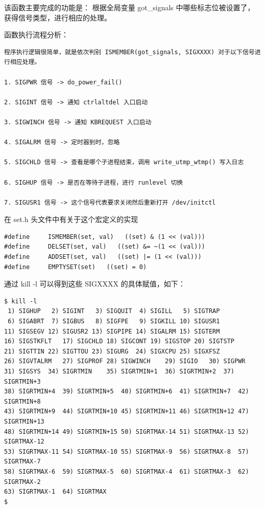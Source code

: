该函数主要完成的功能是： 根据全局变量 got\_signals
中哪些标志位被设置了，获得信号类型，进行相应的处理。

函数执行流程分析：

{\begin{shaded}\begin{verbatim}
程序执行逻辑很简单，就是依次判别 ISMEMBER(got_signals, SIGXXXX) 对于以下信号进行相应处理。

1. SIGPWR 信号 -> do_power_fail()

2. SIGINT 信号 -> 通知 ctrlaltdel 入口启动

3. SIGWINCH 信号 -> 通知 KBREQUEST 入口启动

4. SIGALRM 信号 -> 定时器到时，忽略

5. SIGCHLD 信号 -> 查看是哪个子进程结束，调用 write_utmp_wtmp() 写入日志

6. SIGHUP 信号 -> 是否在等待子进程，进行 runlevel 切换

7. SIGUSR1 信号 -> 这个信号代表要求关闭然后重新打开 /dev/initctl
\end{verbatim}\end{shaded}}
在 set.h 头文件中有关于这个宏定义的实现

{\begin{shaded}\begin{verbatim}
#define     ISMEMBER(set, val)   ((set) & (1 << (val)))
#define     DELSET(set, val)   ((set) &= ~(1 << (val)))
#define     ADDSET(set, val)   ((set) |= (1 << (val)))
#define     EMPTYSET(set)   ((set) = 0)
\end{verbatim}\end{shaded}}
通过 kill -l 可以得到这些 SIGXXXX 的具体赋值，如下：

{\begin{shaded}\begin{verbatim}
$ kill -l
 1) SIGHUP   2) SIGINT   3) SIGQUIT  4) SIGILL   5) SIGTRAP
 6) SIGABRT  7) SIGBUS   8) SIGFPE   9) SIGKILL 10) SIGUSR1
11) SIGSEGV 12) SIGUSR2 13) SIGPIPE 14) SIGALRM 15) SIGTERM
16) SIGSTKFLT   17) SIGCHLD 18) SIGCONT 19) SIGSTOP 20) SIGTSTP
21) SIGTTIN 22) SIGTTOU 23) SIGURG  24) SIGXCPU 25) SIGXFSZ
26) SIGVTALRM   27) SIGPROF 28) SIGWINCH    29) SIGIO   30) SIGPWR
31) SIGSYS  34) SIGRTMIN    35) SIGRTMIN+1  36) SIGRTMIN+2  37) SIGRTMIN+3
38) SIGRTMIN+4  39) SIGRTMIN+5  40) SIGRTMIN+6  41) SIGRTMIN+7  42) SIGRTMIN+8
43) SIGRTMIN+9  44) SIGRTMIN+10 45) SIGRTMIN+11 46) SIGRTMIN+12 47) SIGRTMIN+13
48) SIGRTMIN+14 49) SIGRTMIN+15 50) SIGRTMAX-14 51) SIGRTMAX-13 52) SIGRTMAX-12
53) SIGRTMAX-11 54) SIGRTMAX-10 55) SIGRTMAX-9  56) SIGRTMAX-8  57) SIGRTMAX-7
58) SIGRTMAX-6  59) SIGRTMAX-5  60) SIGRTMAX-4  61) SIGRTMAX-3  62) SIGRTMAX-2
63) SIGRTMAX-1  64) SIGRTMAX    
$ 
\end{verbatim}\end{shaded}}
